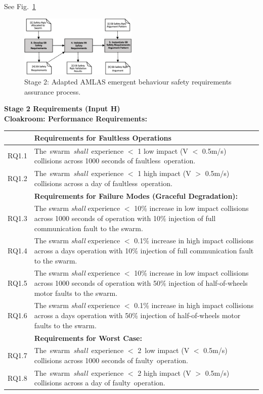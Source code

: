 \documentclass[lettersize,journal]{IEEEtran}
\begin{document}
See Fig.~\ref{amlas-a-stage2}
\begin{figure}
	\centering
	\includegraphics[width=0.5\textwidth]{figures/amlas-a-stage2-v2.png}
	\caption{Stage 2: Adapted AMLAS emergent behaviour safety requirements assurance process.}
	\label{amlas-a-stage2}
\end{figure}

\newpage
\noindent \textbf{Stage 2 Requirements (Input H)}\\
\noindent \textbf{Cloakroom: Performance Requirements: }
\begin{center}
	\begin{tabular}{|p{7mm}|p{72mm}|}
		\hline
		& \textbf{Requirements for Faultless Operations} \\
		\hline
		RQ1.1 & The swarm \emph{shall} experience $<$ 1 low impact (V $<$ 0.5m/s) collisions across 1000 seconds of faultless operation. \\ 
		\hline
		RQ1.2 & The swarm \emph{shall} experience $<$ 1 high impact (V $>$ 0.5m/s) collisions across a day of faultless operation. \\ 
		\hline
        & \textbf{Requirements for Failure Modes (Graceful Degradation): } \\
        \hline
		RQ1.3 & The swarm \emph{shall} experience $<$ 10\% increase in low impact collisions across 1000 seconds of operation with 10\% injection of full communication fault to the swarm. \\
		\hline
		RQ1.4 & The swarm \emph{shall} experience $<$ 0.1\% increase in high impact collisions across a days operation with 10\% injection of full communication fault to the swarm.\\ 
		\hline
		RQ1.5 & The swarm \emph{shall} experience $<$ 10\% increase in low impact collisions across 1000 seconds of operation with 50\% injection of half-of-wheels motor faults to the swarm.\\
		\hline
		RQ1.6 & The swarm \emph{shall} experience $<$ 0.1\% increase in high impact collisions across a days operation with 50\% injection of half-of-wheels motor faults to the swarm.	\\	
		\hline
	    & \textbf{Requirements for Worst Case: } \\
	    \hline
		RQ1.7 & The swarm \emph{shall} experience $<$ 2 low impact (V $<$ 0.5m/s) collisions across 1000 seconds of faulty operation. \\			\hline	
		RQ1.8 & The swarm \emph{shall} experience $<$ 2 high impact (V $>$ 0.5m/s) collisions across a day of faulty operation.  \\		[1ex] 		
		\hline
	\end{tabular}
\end{center}
\end{document}
